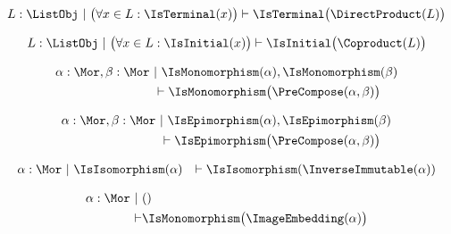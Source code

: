 \begin{sequent}
\begin{align*}
  L: \ListObj ~|~ \big(\forall x \in L: \IsTerminal(x)\big) \vdash \IsTerminal\big( \DirectProduct( L ) \big)
\end{align*}
\end{sequent}

\begin{sequent}
\begin{align*}
  L: \ListObj ~|~ \big(\forall x \in L: \IsInitial(x)\big) \vdash \IsInitial\big( \Coproduct( L ) \big)
\end{align*}
\end{sequent}

\begin{sequent}
\begin{align*}
 \alpha:\Mor, \beta:\Mor ~&|~ \IsMonomorphism( \alpha ), \IsMonomorphism( \beta )  \\
 &\vdash \IsMonomorphism\big( \PreCompose( \alpha, \beta ) \big)
\end{align*}
\end{sequent}

\begin{sequent}
\begin{align*}
 \alpha:\Mor, \beta:\Mor ~&|~ \IsEpimorphism( \alpha ), \IsEpimorphism( \beta )  \\
 &\vdash \IsEpimorphism\big( \PreCompose( \alpha, \beta ) \big)
\end{align*}
\end{sequent}

\begin{sequent}
\begin{align*}
 \alpha:\Mor ~&|~ \IsIsomorphism( \alpha ) &\vdash \IsIsomorphism( \InverseImmutable( \alpha ) )
\end{align*}
\end{sequent}

\begin{sequent}
\begin{align*}
  \alpha:\Mor~|~ & () \\
  \vdash &\IsMonomorphism\big( \ImageEmbedding( \alpha ) \big)
\end{align*}
\end{sequent}
